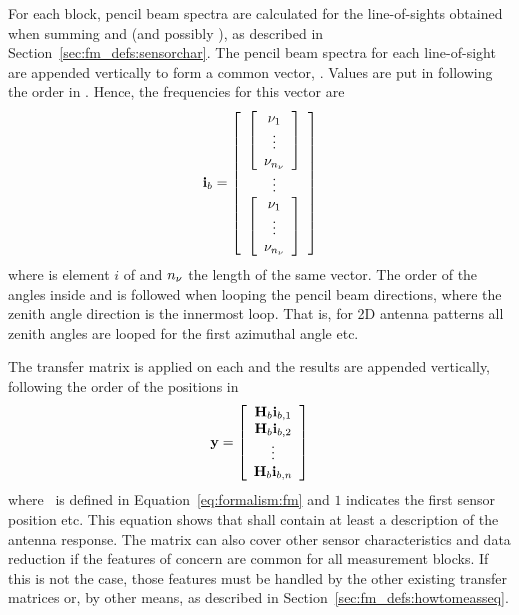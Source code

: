 For each block, pencil beam spectra are calculated for the
line-of-sights obtained when summing  and
 (and possibly
), as described in
Section~\ref{sec:fm_defs:sensorchar}. The pencil beam spectra for each
line-of-sight are appended vertically to form a common vector,
. Values are put in following the order in
. Hence, the frequencies for this vector are
\begin{equation}
  \mathbf{i}_{b} = 
  \left[ \begin{array}{c} 
     \left[
          \begin{array}{c} \nu_{1}\\\vdots\\\nu_{{n_{\nu}}} \end{array} 
     \right] \\
     \vdots \\
     \left[
          \begin{array}{c} \nu_{1}\\\vdots\\\nu_{{n_{\nu}}} \end{array} 
     \right]
     \end{array} \right]
  \label{eq:fm_defs:freqs_of_ib}
\end{equation}
where  is element $i$ of  and $n_{\nu}$ the length of
the same vector. The order of the angles inside 
and  is followed when looping the pencil beam
directions, where the zenith angle direction is the innermost loop.
That is, for 2D antenna patterns all zenith angles are looped for the
first azimuthal angle etc. 

The transfer matrix  is applied on each  and the
results are appended vertically, following the order of the positions
in 
\begin{equation}
  \mathbf{y} = \left[ \begin{array}{c} \mathbf{H}_{b}\mathbf{i}_{{b,1}} \\ 
                                    \mathbf{H}_{b}\mathbf{i}_{{b,2}} \\
                                    \vdots                     \\
                                    \mathbf{H}_{b}\mathbf{i}_{{b,n}} 
            \end{array} \right]
  \label{eq:fm_defs:measseq}
\end{equation}
where \MsrVct\ is defined in Equation~\ref{eq:formalism:fm} and $1$
indicates the first sensor position etc. This equation shows that
 shall contain at least a description of the antenna
response. The matrix  can also cover other sensor
characteristics and data reduction if the features of concern are
common for all measurement blocks. If this is not the case, those
features must be handled by the other existing transfer matrices or, by
other means, as described in Section~\ref{sec:fm_defs:howtomeasseq}.

